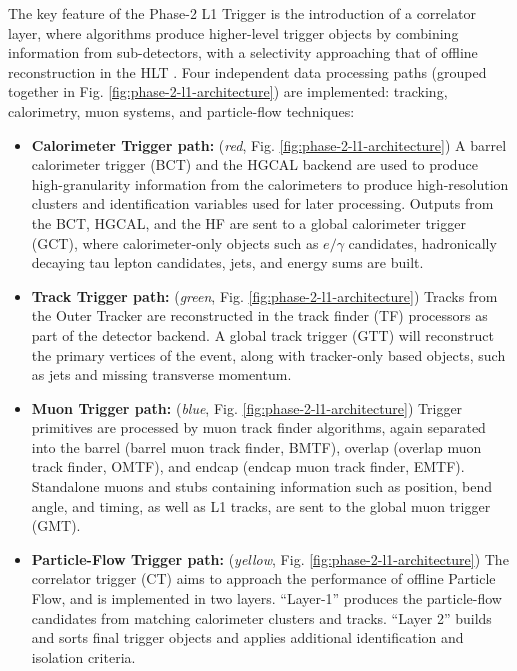 The key feature of the Phase-2 L1 Trigger is the introduction of a correlator layer, where algorithms produce higher-level trigger objects by combining information from sub-detectors, with a selectivity approaching that of offline reconstruction in the HLT \cite{CMS-TDR-021}. Four independent data processing paths (grouped together in Fig. \ref{fig:phase-2-l1-architecture}) are implemented: tracking, calorimetry, muon systems, and particle-flow techniques:
\begin{itemize}
    \item \textbf{Calorimeter Trigger path:} (\textit{red}, Fig. \ref{fig:phase-2-l1-architecture}) A barrel calorimeter trigger (BCT) and the HGCAL backend are used to produce high-granularity information from the calorimeters to produce high-resolution clusters and identification variables used for later processing. Outputs from the BCT, HGCAL, and the HF are sent to a global calorimeter trigger (GCT), where calorimeter-only objects such as $e/\gamma$ candidates, hadronically decaying tau lepton candidates, jets, and energy sums are built.
    \item \textbf{Track Trigger path:} (\textit{green}, Fig. \ref{fig:phase-2-l1-architecture}) Tracks from the Outer Tracker are reconstructed in the track finder (TF) processors as part of the detector backend. A global track trigger (GTT) will reconstruct the primary vertices of the event, along with tracker-only based objects, such as jets and missing transverse momentum.
    \item \textbf{Muon Trigger path:} (\textit{blue}, Fig. \ref{fig:phase-2-l1-architecture}) Trigger primitives are processed by muon track finder algorithms, again separated into the barrel (barrel muon track finder, BMTF), overlap (overlap muon track finder, OMTF), and endcap (endcap muon track finder, EMTF). Standalone muons and stubs containing information such as position, bend angle, and timing, as well as L1 tracks, are sent to the global muon trigger (GMT).
    \item \textbf{Particle-Flow Trigger path:} (\textit{yellow}, Fig. \ref{fig:phase-2-l1-architecture}) The correlator trigger (CT) aims to approach the performance of offline Particle Flow, and is implemented in two layers. ``Layer-1'' produces the particle-flow candidates from matching calorimeter clusters and tracks. ``Layer 2'' builds and sorts final trigger objects and applies additional identification and isolation criteria.
\end{itemize}

